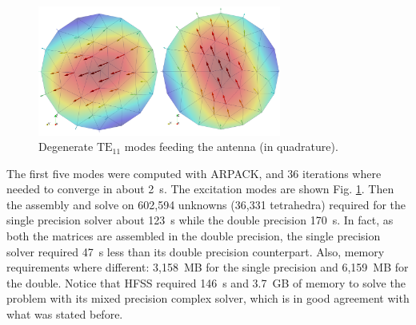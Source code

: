 \begin{figure}[ht!]
\centering
\includegraphics[width=8cm]{Modes}
\caption{Degenerate $\mathrm{TE}_{11}$ modes feeding the antenna (in quadrature).}
\label{fig:Modes}
\end{figure}


The first five modes were computed with ARPACK, and 36 iterations where needed to converge in about 2~s. The excitation modes are shown Fig. \ref{fig:Modes}. Then the assembly and solve on 602,594 unknowns (36,331 tetrahedra) required for the single precision solver about 123~s while the double precision 170~s. In fact, as both the matrices are assembled in the double precision, the single precision solver required 47~s less than its double precision counterpart. Also, memory requirements where different: 3,158~MB for the single precision and 6,159~MB for the double. Notice that HFSS required 146~s and 3.7~GB of memory to solve the problem with its mixed precision complex solver, which is in good agreement with what was stated before.

